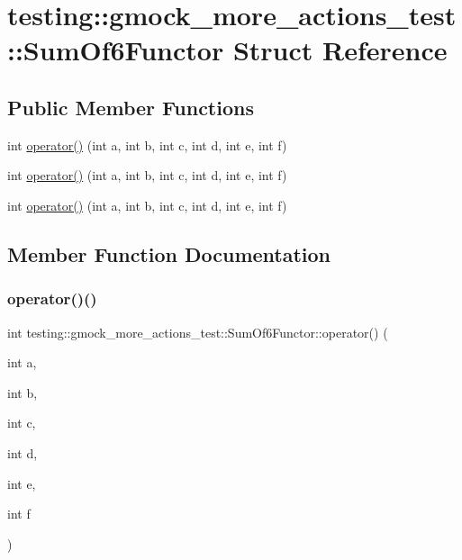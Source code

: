 \hypertarget{structtesting_1_1gmock__more__actions__test_1_1_sum_of6_functor}{}\section{testing\+::gmock\+\_\+more\+\_\+actions\+\_\+test\+::Sum\+Of6\+Functor Struct Reference}
\label{structtesting_1_1gmock__more__actions__test_1_1_sum_of6_functor}
\subsection*{Public Member Functions}
\begin{DoxyCompactItemize}
\item 
int \mbox{\hyperlink{structtesting_1_1gmock__more__actions__test_1_1_sum_of6_functor_adc0cc4dbd423db7298497b8a9630067e}{operator()}} (int a, int b, int c, int d, int e, int f)
\item 
int \mbox{\hyperlink{structtesting_1_1gmock__more__actions__test_1_1_sum_of6_functor_adc0cc4dbd423db7298497b8a9630067e}{operator()}} (int a, int b, int c, int d, int e, int f)
\item 
int \mbox{\hyperlink{structtesting_1_1gmock__more__actions__test_1_1_sum_of6_functor_adc0cc4dbd423db7298497b8a9630067e}{operator()}} (int a, int b, int c, int d, int e, int f)
\end{DoxyCompactItemize}


\subsection{Member Function Documentation}
\mbox{\label{structtesting_1_1gmock__more__actions__test_1_1_sum_of6_functor_adc0cc4dbd423db7298497b8a9630067e}} 
\subsubsection{\texorpdfstring{operator()()}{operator()()}\hspace{0.1cm}{\footnotesize\ttfamily [1/3]}}
{\footnotesize\ttfamily int testing\+::gmock\+\_\+more\+\_\+actions\+\_\+test\+::\+Sum\+Of6\+Functor\+::operator() (\begin{DoxyParamCaption}\item[{int}]{a,  }\item[{int}]{b,  }\item[{int}]{c,  }\item[{int}]{d,  }\item[{int}]{e,  }\item[{int}]{f }\end{DoxyParamCaption})\hspace{0.3cm}{\ttfamily [inline]}}

